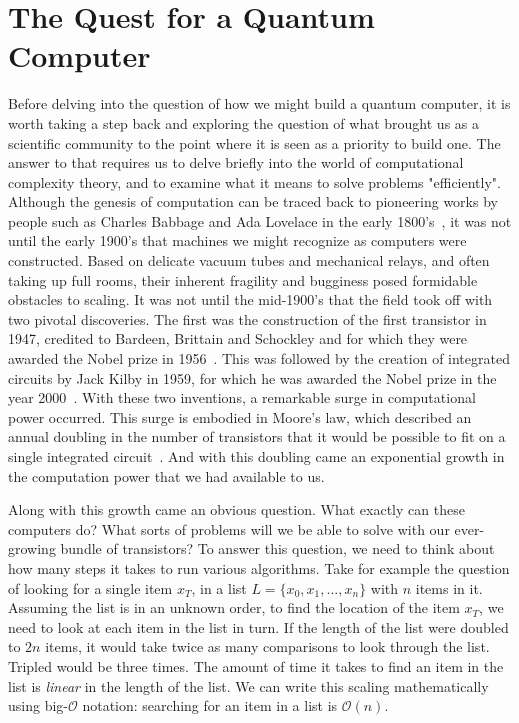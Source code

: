 \chapter{The Quest for a Quantum Computer}
Before delving into the question of how we might build a quantum computer, it is worth taking a step
back and exploring the question of what brought us as a scientific community to the point where
it is seen as a priority to build one. The answer to that requires us to delve briefly into
the world of computational complexity theory, and to examine what it means to solve problems "efficiently".
Although the genesis of computation can be traced back to pioneering works by people such as Charles Babbage
and Ada Lovelace in the early 1800's~\cite{Bowden:1953:FTS:1102044}, it was not until the early 1900's that
machines we might recognize as computers were constructed. Based on delicate vacuum tubes and mechanical relays,
and often taking up full rooms, their inherent fragility and bugginess posed formidable obstacles to scaling.
It was not until the mid-1900's that the field took off with two pivotal discoveries. The first
was the construction of the first transistor in 1947, credited to Bardeen, Brittain and Schockley and for which
they were awarded the Nobel prize in 1956~\cite{nobel1956}. This was followed by the creation of integrated circuits by Jack Kilby
in 1959, for which he was awarded the Nobel prize in the year 2000~\cite{nobel2000}. With these two inventions, a remarkable
surge in computational power occurred. This surge is embodied in Moore's law, which described an annual
doubling in the number of transistors that it would be possible to fit on a single integrated circuit~\cite{4785860}.
And with this doubling came an exponential growth in the computation power that we had available to us.

Along with this growth came an obvious question. What exactly can these computers do? What sorts of
problems will we be able to solve with our ever-growing bundle of transistors? To answer this question, we need to
think about how many steps it takes to run various algorithms. Take for example the question of looking
for a single item $x_T$, in a list $L = \{x_0, x_1, ..., x_n\}$ with $n$ items in it. Assuming the list
is in an unknown order, to find the location of the item $x_T$, we need to look at each item in the list
in turn. If the length of the list were doubled to $2n$ items, it would take twice as many comparisons to
look through the list. Tripled would be three times. The amount of time it takes to find an item in the
list is \emph{linear} in the length of the list. We can write this scaling mathematically using big-$\mathcal{O}$
notation: searching for an item in a list is $\mathcal{O}(n)$.

